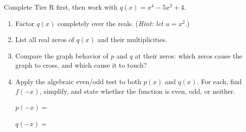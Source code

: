\documentclass[10pt]{article}
\begin{document}
\vspace{0.1in}

\begin{tcolorbox}[colback=white, colframe=black!40,
    title=\textbf{Tier A --- Apply},
    fonttitle=\bfseries, arc=2mm, left=3mm, right=3mm, top=2mm, bottom=2mm]

Complete Tier R first, then work with $q(x)=x^4-5x^2+4$.

\begin{enumerate}[leftmargin=1.5em, itemsep=8pt]
  \item Factor $q(x)$ completely over the reals. (\textit{Hint: let $u=x^2$}.)

  \item List all real zeros of $q(x)$ and their multiplicities.
        \writeline

  \item Compare the graph behavior of $p$ and $q$ at their zeros:
        which zeros cause the graph to cross, and which cause it to touch?

  \item Apply the algebraic even/odd test to both $p(x)$ and $q(x)$.
        For each, find $f(-x)$, simplify, and state whether the function is
        even, odd, or neither.

        $p(-x) = $ 

        $q(-x) = $ 

\end{enumerate}
\end{tcolorbox}

\vspace{0.1in}
\end{document}
